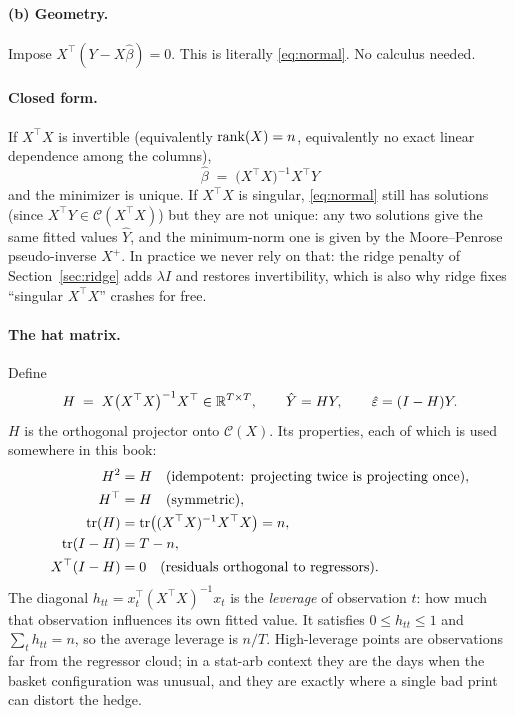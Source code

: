 \paragraph{(b) Geometry.} Impose $X^{\top}(Y-X\hat\beta)=0$. This is literally
\eqref{eq:normal}. No calculus needed.

\paragraph{Closed form.} If $X^{\top}X$ is invertible (equivalently $\operatorname{rank}(X)=n$,
equivalently no exact linear dependence among the columns),
\begin{equation}
  \boxed{\ \hat\beta \;=\; \bigl(X^{\top}X\bigr)^{-1}X^{\top}Y\ }
  \label{eq:ols}
\end{equation}
and the minimizer is unique. If $X^{\top}X$ is singular, \eqref{eq:normal} still has
solutions (since $X^{\top}Y\in\mathcal C(X^{\top}X)$) but they are not unique: any two
solutions give the same fitted values $\hat Y$, and the minimum-norm one is given by the
Moore--Penrose pseudo-inverse $X^{+}$. In practice we never rely on that: the ridge
penalty of Section~\ref{sec:ridge} adds $\lambda I$ and restores invertibility, which is
also why ridge fixes ``singular $X^{\top}X$'' crashes for free.

\paragraph{The hat matrix.} Define
\begin{equation}
  H \;=\; X\bigl(X^{\top}X\bigr)^{-1}X^{\top}\in\mathbb{R}^{T\times T},
  \qquad \hat Y = HY,\qquad \hat{\varepsilon} = (I-H)Y .
  \label{eq:hatmatrix}
\end{equation}
$H$ is the orthogonal projector onto $\mathcal C(X)$. Its properties, each of which is
used somewhere in this book:
\begin{align}
  H^2 &= H \quad\text{(idempotent: projecting twice is projecting once)}, \label{eq:hat:idem}\\
  H^{\top} &= H \quad\text{(symmetric)}, \label{eq:hat:sym}\\
  \operatorname{tr}(H) &= \operatorname{tr}\bigl((X^{\top}X)^{-1}X^{\top}X\bigr) = n, \label{eq:hat:trace}\\
  \operatorname{tr}(I-H) &= T-n, \label{eq:hat:trace2}\\
  X^{\top}(I-H) &= 0 \quad\text{(residuals orthogonal to regressors)}. \label{eq:hat:orth}
\end{align}
The diagonal $h_{tt}=x_t^{\top}(X^{\top}X)^{-1}x_t$ is the \emph{leverage} of
observation $t$: how much that observation influences its own fitted value. It satisfies
$0\le h_{tt}\le1$ and $\sum_t h_{tt}=n$, so the average leverage is $n/T$. High-leverage
points are observations far from the regressor cloud; in a stat-arb context they are the
days when the basket configuration was unusual, and they are exactly where a single bad
print can distort the hedge.

